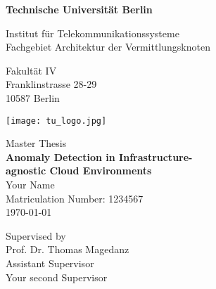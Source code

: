 \thispagestyle{empty}
\begin{center}

\vspace*{1.4cm}
{\LARGE \textbf{Technische Universit\"at Berlin}}

\vspace{0.5cm}

{\large Institut f\"ur Telekommunikationssysteme\\[1mm]}
{\large Fachgebiet Architektur der Vermittlungsknoten\\[5mm]}

Fakult\"at IV\\
Franklinstrasse 28-29\\
10587 Berlin\\

\vspace*{1cm}

\texttt{[image: tu\_logo.jpg]}

\vspace*{1.0cm}

{\LARGE Master Thesis}\\

\vspace{1.0cm}
{\LARGE \textbf{Anomaly Detection in Infrastructure-}}\\
\vspace*{0.3cm}
{\LARGE \textbf{agnostic Cloud Environments}}\\
\vspace*{1.0cm}
{\LARGE Your Name}
\\
\vspace*{0.5cm}
Matriculation Number: 1234567\\
\today\\ %
\vspace*{1.0cm}

Supervised by\\
Prof. Dr. Thomas Magedanz\\
\vspace*{0.5cm}
Assistant Supervisor\\
Your second Supervisor
\vspace{3cm}


\end{center}

